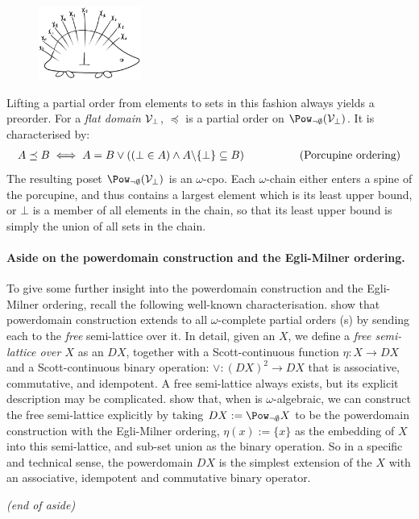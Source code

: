 \begin{figure}
  \vspace{-40pt}
  \begin{center}
    \includegraphics[width=0.3\textwidth]{porcupine.png}
  \end{center}
\end{figure}%

\noindent Lifting a partial order from elements to sets in this
fashion always yields a preorder. For a \emph{flat domain} $\mathcal{V}_\bot$, $\preceq$ is a partial order on
$\Pow_{\neg \emptyset}(\V_\bot)$. It is characterised by:
\begin{align*}
     &A \preceq B \iff  A = B \lor ((\bot \in A) \land A {\setminus} \{\bot\} \subseteq B)  &\qquad\qquad\text{\centering(Porcupine ordering)}
\end{align*}
The resulting poset $\Pow_{\neg \emptyset}(\V_\bot)$ is an $\omega$-cpo.
Each $\omega$-chain either enters a spine of the
porcupine, and thus contains a largest element which is its least upper bound,
or $\bot$ is a member of all elements in the chain, so that its least upper bound is simply the union of all sets in the chain.

\paragraph*{Aside on the powerdomain construction and the Egli-Milner ordering.}
To give some further insight into the powerdomain construction and the Egli-Milner ordering, recall the following well-known characterisation. \citet[Remark after Lemma~3.5]{hennessy-plotkin:plotkin-powerdomain} show that
 powerdomain construction extends to all
$\omega$-complete partial orders (\wcpo{}s) by sending each \wcpo{} to
the \emph{free} semi-lattice over it. In detail, given an \wcpo{} $X$,
we define a \emph{free semi-lattice over $X$} as an \wcpo{} $DX$,
together with a Scott-continuous function $\eta : X \to DX$ and a
Scott-continuous binary operation: $\vee : (DX)^2 \to DX$ that is
associative, commutative, and idempotent. A free semi-lattice always
exists, but its explicit description may be complicated.
\citeauthor{hennessy-plotkin:plotkin-powerdomain} show that, when
\wcpo{} is $\omega$-algebraic, we can construct the free semi-lattice
explicitly by taking $DX := \Pow_{\lnot \emptyset}X$ to be the
powerdomain construction with the Egli-Milner ordering, $\eta(x) :=
\{x\}$ as the embedding of $X$ into this semi-lattice, and sub-set
union as the binary operation.  So in a specific and technical sense,
the powerdomain $DX$ is the simplest extension of the \wcpo{} $X$ with
an associative, idempotent and commutative binary operator.
\begin{flushright}
\vspace*{-1em}
	\textit{(end of aside)}
\end{flushright}

